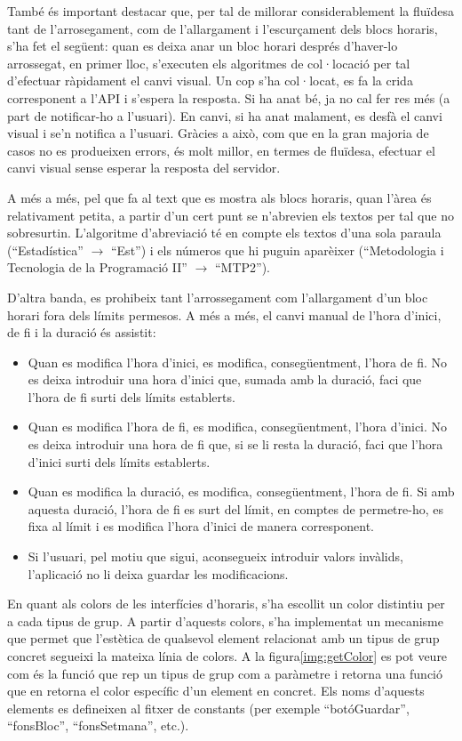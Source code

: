 \documentclass[a4paper,12pt]{ThesisStyle}
\begin{document}
També és important destacar que, per tal de millorar considerablement la fluïdesa tant de l'arrosegament, com de l'allargament i l'escurçament dels blocs horaris, s'ha fet el següent: quan es deixa anar un bloc horari després d'haver-lo arrossegat, en primer lloc, s'executen els algoritmes de col·locació per tal d'efectuar ràpidament el canvi visual. Un cop s'ha col·locat, es fa la crida corresponent a l'API i s'espera la resposta. Si ha anat bé, ja no cal fer res més (a part de notificar-ho a l'usuari). En canvi, si ha anat malament, es desfà el canvi visual i se'n notifica a l'usuari. Gràcies a això, com que en la gran majoria de casos no es produeixen errors, és molt millor, en termes de fluïdesa, efectuar el canvi visual sense esperar la resposta del servidor.

A més a més, pel que fa al text que es mostra als blocs horaris, quan l'àrea és relativament petita, a partir d'un cert punt se n'abrevien els textos per tal que no sobresurtin. L'algoritme d'abreviació té en compte els textos d'una sola paraula (``Estadística'' $\rightarrow$ ``Est'') i els números que hi puguin aparèixer (``Metodologia i Tecnologia de la Programació II'' $\rightarrow$ ``MTP2'').

D'altra banda, es prohibeix tant l'arrossegament com l'allargament d'un bloc horari fora dels límits permesos. A més a més, el canvi manual de l'hora d'inici, de fi i la duració és assistit:
\begin{itemize}
  \item Quan es modifica l'hora d'inici, es modifica, consegüentment, l'hora de fi. No es deixa introduir una hora d'inici que, sumada amb la duració, faci que l'hora de fi surti dels límits establerts.
  \item Quan es modifica l'hora de fi, es modifica, consegüentment, l'hora d'inici. No es deixa introduir una hora de fi que, si se li resta la duració, faci que l'hora d'inici surti dels límits establerts.
  \item Quan es modifica la duració, es modifica, consegüentment, l'hora de fi. Si amb aquesta duració, l'hora de fi es surt del límit, en comptes de permetre-ho, es fixa al límit i es modifica l'hora d'inici de manera corresponent.
  \item Si l'usuari, pel motiu que sigui, aconsegueix introduir valors invàlids, l'aplicació no li deixa guardar les modificacions.
\end{itemize}

En quant als colors de les interfícies d'horaris, s'ha escollit un color distintiu per a cada tipus de grup. A partir d'aquests colors, s'ha implementat un mecanisme que permet que l'estètica de qualsevol element relacionat amb un tipus de grup concret segueixi la mateixa línia de colors. A la figura\ref{img:getColor} es pot veure com és la funció que rep un tipus de grup com a paràmetre i retorna una funció que en retorna el color específic d'un element en concret. Els noms d'aquests elements es defineixen al fitxer de constants (per exemple ``botóGuardar'', ``fonsBloc'', ``fonsSetmana'', etc.).
\end{document}
